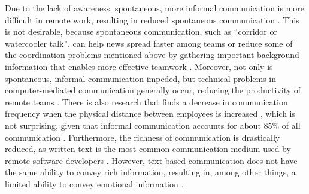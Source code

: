 Due to the lack of awareness, spontaneous, more informal communication is more difficult in remote work, resulting in reduced spontaneous communication \autocite{kraut1988patterns, sengupta2006research, herbsleb2007global, hinds2005understanding}. This is not desirable, because spontaneous communication, such as \enquote{corridor or watercooler talk}, can help news spread faster among teams \autocite{herbsleb2000distance} or reduce some of the coordination problems \autocite{herbsleb1999architectures} mentioned above by gathering important background information that enables more effective teamwork \autocite{lanubile2007collaboration, herbsleb2001global}. Moreover, not only is spontaneous, informal communication impeded, but technical problems in computer-mediated communication generally occur, reducing the productivity of remote teams \autocite{sengupta2006research}. There is also research that finds a decrease in communication frequency when the physical distance between employees is increased \autocite{herbsleb2003empirical}, which is not surprising, given that informal communication accounts for about 85\% of all communication \autocite{kraut1990informal}. Furthermore, the richness of communication is drastically reduced, as written text is the most common communication medium used by remote software developers \autocite{gutwin2004group}. However, text-based communication does not have the same ability to convey rich information, resulting in, among other things, a limited ability to convey emotional information \autocite{hook2008interactional}.


